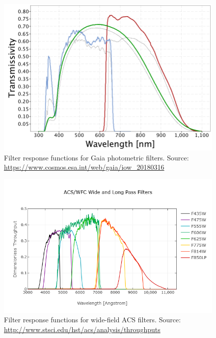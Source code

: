 \documentclass[12pt, a4paper]{report}
\begin{document}
\begin{figure}[h]
\begin{center}
\includegraphics[scale=0.5]{GaiaDR2Passbands.png}
\caption{Filter response functions for Gaia photometric filters. Source: \protect\url{https://www.cosmos.esa.int/web/gaia/iow_20180316}}
\label{Gaia_response_funcs}
\end{center}
\end{figure}

\begin{figure}[h]
\begin{center}
\includegraphics[scale=0.5]{ACS_Wide.png}
\caption{Filter response functions for wide-field ACS filters. Source: \protect\url{http://www.stsci.edu/hst/acs/analysis/throughputs}}
\label{ACS_response_funcs}
\end{center}
\end{figure}
\end{document}

